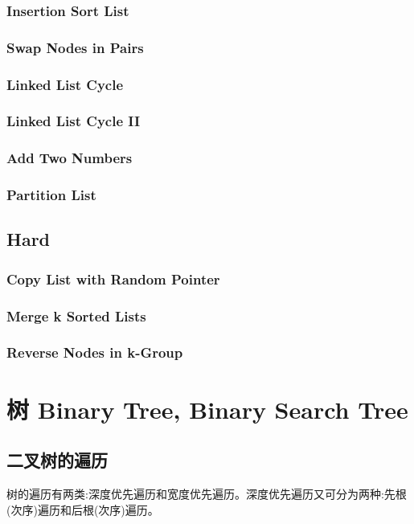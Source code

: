 \documentclass[12pt]{book}
\begin{document}
\subsection{Insertion Sort List}
\label{sec-3-2-7}
\subsection{Swap Nodes in Pairs}
\label{sec-3-2-8}
\subsection{Linked List Cycle}
\label{sec-3-2-9}
\subsection{Linked List Cycle II}
\label{sec-3-2-10}
\subsection{Add Two Numbers}
\label{sec-3-2-11}
\subsection{Partition List}
\label{sec-3-2-12}
\section{Hard}
\label{sec-3-3}
\subsection{Copy List with Random Pointer}
\label{sec-3-3-1}
\subsection{Merge k Sorted Lists}
\label{sec-3-3-2}
\subsection{Reverse Nodes in k-Group}
\label{sec-3-3-3}

\chapter{树 Binary Tree, Binary Search Tree}
\label{sec-4}
\section{二叉树的遍历}
\label{sec-4-1}

树的遍历有两类:深度优先遍历和宽度优先遍历。深度优先遍历又可分为两种:先根(次序)遍历和后根(次序)遍历。
\end{document}
